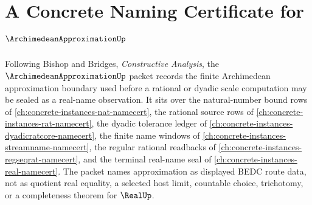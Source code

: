 \chapter{A Concrete Naming Certificate for $\ArchimedeanApproximationUp$}
\label{ch:concrete-instances-archimedeanapproximation-namecert}

Following Bishop and Bridges, \emph{Constructive Analysis}, the $\ArchimedeanApproximationUp$ packet records the finite Archimedean approximation boundary used before a rational or dyadic scale computation may be sealed as a real-name observation. It sits over the natural-number bound rows of \autoref{ch:concrete-instances-nat-namecert}, the rational source rows of \autoref{ch:concrete-instances-rat-namecert}, the dyadic tolerance ledger of \autoref{ch:concrete-instances-dyadicratcore-namecert}, the finite name windows of \autoref{ch:concrete-instances-streamname-namecert}, the regular rational readbacks of \autoref{ch:concrete-instances-regseqrat-namecert}, and the terminal real-name seal of \autoref{ch:concrete-instances-real-namecert}. The packet names approximation as displayed BEDC route data, not as quotient real equality, a selected host limit, countable choice, trichotomy, or a completeness theorem for $\RealUp$.

